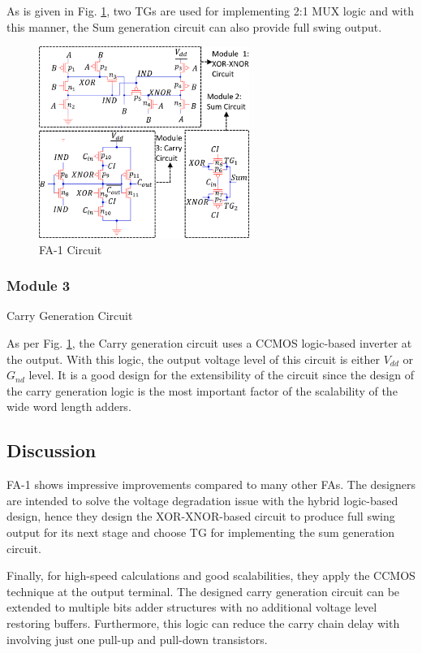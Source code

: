\documentclass[conference]{IEEEtran}
\begin{document}
As is given in Fig. \ref{fig:fa1-circuit}, two TGs are used for implementing 2:1 MUX logic and with this manner,
the Sum generation circuit can also provide full swing output.

\begin{figure}[!hb]
	\centering
	\includegraphics[width=2.7in]{fa1-circuit.png}
	\caption{FA-1 Circuit}
	\label{fig:fa1-circuit}
\end{figure}

\subsubsection{Module 3}Carry Generation Circuit

As per Fig. \ref{fig:fa1-circuit}, the Carry generation circuit uses a CCMOS logic-based inverter at the output.
With this logic, the output voltage level of this circuit is either \(V_{dd}\) or \(G_{nd}\) level.
It is a good design for the extensibility of the circuit
since the design of the carry generation logic is the most important factor of the scalability of the wide word length adders.


\subsection{Discussion}

FA-1 shows impressive improvements compared to many other FAs.
The designers are intended to solve the voltage degradation issue with the hybrid logic-based design,
hence they design the XOR-XNOR-based circuit to produce full swing output for its next stage
and choose TG for implementing the sum generation circuit.

Finally, for high-speed calculations and good scalabilities,
they apply the CCMOS technique at the output terminal.
The designed carry generation circuit can be extended to multiple bits adder structures with no additional voltage level restoring buffers.
Furthermore, this logic can reduce the carry chain delay with involving just one pull-up and pull-down transistors.
\end{document}
